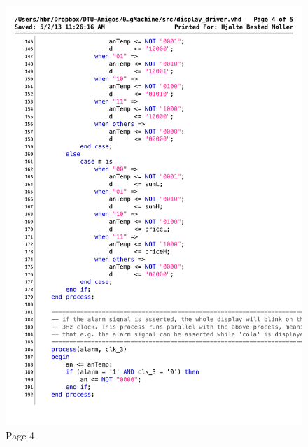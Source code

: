 \begin{figure}[!h]
\centering
\includegraphics[scale=0.7]{figs/display_driver_4.pdf}
\caption{Page 4}
\label{vhd:dispdriv4}
\end{figure}

